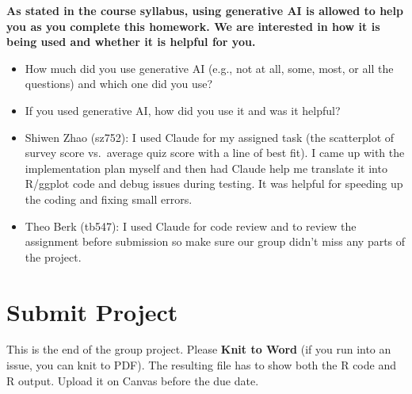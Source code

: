\documentclass[
]{article}
\begin{document}
\textbf{As stated in the course syllabus, using generative AI is allowed
to help you as you complete this homework. We are interested in how it
is being used and whether it is helpful for you.}

\begin{itemize}
\item
  How much did you use generative AI (e.g., not at all, some, most, or
  all the questions) and which one did you use?
\item
  If you used generative AI, how did you use it and was it helpful?
\item
  Shiwen Zhao (sz752): I used Claude for my assigned task (the
  scatterplot of survey score vs.~average quiz score with a line of best
  fit). I came up with the implementation plan myself and then had
  Claude help me translate it into R/ggplot code and debug issues during
  testing. It was helpful for speeding up the coding and fixing small
  errors.
\item
  Theo Berk (tb547): I used Claude for code review and to review the
  assignment before submission so make sure our group didn't miss any
  parts of the project.
\end{itemize}

\section{Submit Project}\label{submit-project}

This is the end of the group project. Please \textbf{Knit to Word} (if
you run into an issue, you can knit to PDF). The resulting file has to
show both the R code and R output. Upload it on Canvas before the due
date.
\end{document}
